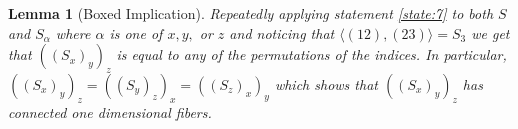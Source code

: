 \documentclass{article}
\newcommand{\sxyz}{((S_x)_y)_z}
\newcommand{\Sxyz}[3]{((S_#1)_#2)_#3}
\theoremstyle{mystyle}
\newtheorem{lem}{Lemma}[section]
\theoremstyle{remark}
\begin{document}
\begin{lem}
    [Boxed Implication]
 \label{lem:boximp} 
    Repeatedly applying statement \ref{state:7} to both \(S\) and \(S_{\alpha}\) where \(\alpha\) is one of \(x,y,\) or \(z\)  and noticing that \(\langle (12),(23) \rangle = S_{3}\) we get that \(\sxyz\) is equal to any of the permutations of the indices. In particular, \(\Sxyz{x}{y}{z}=\Sxyz{y}{z}{x}=\Sxyz{z}{x}{y}\) which shows that \(\sxyz\) has connected one dimensional fibers.
\end{lem}
\end{document}
